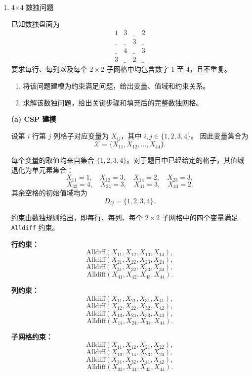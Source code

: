 \documentclass[a4paper]{article}
\begin{document}
\courseheader
{}

\begin{enumerate}
\setlength{\itemsep}{3\parskip}

\item 4\(\times\)4 数独问题

已知数独盘面为
\[
\begin{matrix}
1 & 3 & \_ & 2\\
\_ & \_ & 3 & \_\\
\_ & 4 & \_ & 3\\
3 & \_ & 2 & \_
\end{matrix}
\]
要求每行、每列以及每个 \(2\times 2\) 子网格中均包含数字 1 至 4，且不重复。

\begin{enumerate}
\item 将该问题建模为约束满足问题，给出变量、值域和约束关系。
\item 求解该数独问题，给出关键步骤和填充后的完整数独网格。
\end{enumerate}

\begin{solution}
\textbf{(a) CSP 建模}

设第 \(i\) 行第 \(j\) 列格子对应变量为 \(X_{ij}\)，其中 \(i,j\in\{1,2,3,4\}\)。
因此变量集合为
\[
\mathcal X=\{X_{11},X_{12},\dots,X_{44}\}.
\]

每个变量的取值均来自集合 \(\{1,2,3,4\}\)。对于题目中已经给定的格子，其值域退化为单元素集合：
\[
X_{11}=1,\quad X_{12}=3,\quad X_{14}=2,\quad X_{23}=3,
\]
\[
X_{32}=4,\quad X_{34}=3,\quad X_{41}=3,\quad X_{43}=2.
\]
其余空格的初始值域均为
\[
D_{ij}=\{1,2,3,4\}.
\]

约束由数独规则给出，即每行、每列、每个 \(2\times 2\) 子网格中的四个变量满足 \texttt{Alldiff} 约束。

\textbf{行约束：}
\[
\mathrm{Alldiff}(X_{11},X_{12},X_{13},X_{14}),
\]
\[
\mathrm{Alldiff}(X_{21},X_{22},X_{23},X_{24}),
\]
\[
\mathrm{Alldiff}(X_{31},X_{32},X_{33},X_{34}),
\]
\[
\mathrm{Alldiff}(X_{41},X_{42},X_{43},X_{44}).
\]

\textbf{列约束：}
\[
\mathrm{Alldiff}(X_{11},X_{21},X_{31},X_{41}),
\]
\[
\mathrm{Alldiff}(X_{12},X_{22},X_{32},X_{42}),
\]
\[
\mathrm{Alldiff}(X_{13},X_{23},X_{33},X_{43}),
\]
\[
\mathrm{Alldiff}(X_{14},X_{24},X_{34},X_{44}).
\]

\textbf{子网格约束：}
\[
\mathrm{Alldiff}(X_{11},X_{12},X_{21},X_{22}),
\]
\[
\mathrm{Alldiff}(X_{13},X_{14},X_{23},X_{24}),
\]
\[
\mathrm{Alldiff}(X_{31},X_{32},X_{41},X_{42}),
\]
\[
\mathrm{Alldiff}(X_{33},X_{34},X_{43},X_{44}).
\]


\end{solution}
\end{enumerate}
\end{document}

